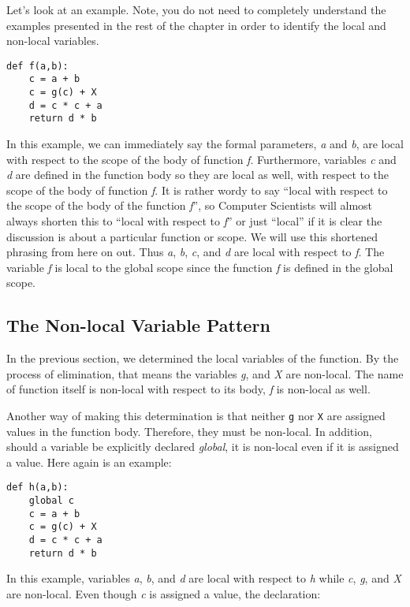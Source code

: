 Let's look at an example.
Note,
you do not need to completely understand the examples presented in
the rest of the chapter in order 
to identify the local and non-local variables.

\begin{verbatim}
def f(a,b):
    c = a + b
    c = g(c) + X
    d = c * c + a
    return d * b
\end{verbatim}

In this example, we can immediately say the 
formal parameters,
{\it a} and {\it b},
are local with respect to the scope of the body of function {\it f}.
Furthermore, variables
{\it c} and {\it d}
are defined in the function body
so they are local as well,
with respect to the scope of the body of function {\it f}.
It is rather wordy to say ``local with respect to the
scope of the body of the function {\it f}'', so Computer Scientists
will almost always shorten this to ``local with respect to {\it f}''
or just ``local''
if it is clear the discussion is about a particular function or scope.
We will use this shortened phrasing from here on out.
Thus {\it a}, {\it b}, {\it c}, and {\it d} are local with respect to {\it f}.
The variable {\it f} is local to the global scope since the function
{\it f} is defined in the global scope.

\subsection{The Non-local Variable Pattern}

In the previous section, we determined the local
variables of the function.
By the process 
of elimination, that means the variables
{\it g}, and {\it X} are non-local.
The name of function itself is non-local with respect
to its body, {\it f} is non-local as well.

Another way of making this determination is
that
neither {\tt g} nor {\tt X} are assigned values
in the function body. Therefore, they must be non-local.
In addition, should a variable be explicitly declared {\it global},
it is non-local even if it is assigned a value.
Here again is an example:

\begin{verbatim}
def h(a,b):
    global c
    c = a + b
    c = g(c) + X
    d = c * c + a
    return d * b
\end{verbatim}

In this example, variables {\it a}, {\it b}, and {\it d} are local with respect
to {\it h} while {\it c}, {\it g}, and {\it X} are non-local.
Even though {\it c} is assigned a value, the declaration:

